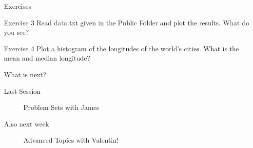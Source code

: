 \documentclass{beamer}
\begin{document}
\begin{frame}[fragile]{Exercises}
	\begin{block}{Exercise 3}
		Read data.txt given in the Public Folder and plot the results.
		What do you see?
	\end{block}
	\begin{block}{Exercise 4}
		Plot a histogram of the longitudes of the world's cities. What is the mean and median longitude?
\end{block}

\end{frame}


\begin{frame}{What is next?}
  \begin{description}
    \item[Last Session] Problem Sets with James
    \item[Also next week] Advanced Topics with Valentin!
  \end{description}
\end{frame}
%	
%	
%	
%	
\end{document}
